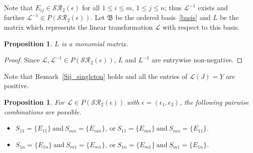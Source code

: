 \documentclass[11pt,reqno]{amsart}
\theoremstyle{plain}
\newtheorem{prop}[theorem]{Proposition}
\theoremstyle{definition}
\numberwithin{equation}{section}
\begin{document}
Note that $E_{ij}\in \mathcal{SR}_2(\epsilon)$ for all $1\leq i\leq m$, $1\leq j\leq n$; thus $\mathcal{L}^{-1}$ exists and further $\mathcal{L}^{-1}\in P(\mathcal{SR}_2(\epsilon))$. Let $\mathfrak{B}$ be the ordered basis~\eqref{basis} and $L$ be the matrix which represents the linear transformation $\mathcal{L}$ with respect to this basis.
\begin{prop} \label{SR_epsilon_monomial}
	$L$ is a monomial matrix.
\end{prop}	
\begin{proof}
	Since $\mathcal{L}, \mathcal{L}^{-1}\in P(\mathcal{SR}_2(\epsilon))$, $L$ and $L^{-1}$ are entrywise non-negative.
\end{proof}	
Note that Remark~\ref{Sij_singleton} holds and all the entries of $\mathcal{L}(J)=Y$ are positive.
\begin{prop} \label{SR_epsilon_S11Snn_S1nSn1_combo}
	For $\mathcal{L}\in P(\mathcal{SR}_2(\epsilon))$ with $\epsilon=(\epsilon_1,\epsilon_2)$, the following pairwise combinations are possible.
	\begin{itemize}
		\item[(i)] $S_{11}=\{E_{11}\}~ \text{and} ~ S_{mn}=\{E_{mn}\}, ~ \text{or} ~ S_{11}=\{E_{mn}\} ~ \text{and} ~ S_{mn}=\{E_{11}\}$.
		
		\item[(ii)] $S_{1n}=\{E_{1n}\} ~ \text{and} ~ S_{m1}=\{E_{m1}\}, ~ \text{or} ~ S_{1n}=\{E_{m1}\} ~ \text{and} ~ S_{m1}=\{E_{1n}\}$.
	\end{itemize}
\end{prop}
\end{document}
